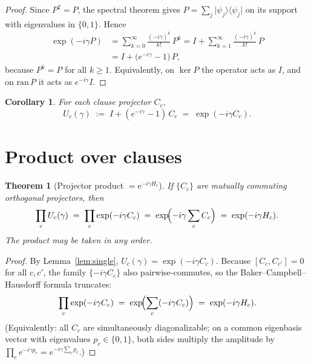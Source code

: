 \documentclass[11pt]{article}
\newtheorem{theorem}{Theorem}
\newtheorem{corollary}{Corollary}
\theoremstyle{definition}
\begin{document}
\begin{proof}
Since $P^2=P$, the spectral theorem gives $P = \sum_j \lvert\psi_j\rangle\langle\psi_j\rvert$
on its support with eigenvalues in $\{0,1\}$.  Hence
\begin{align}
  \exp(-i\gamma P)
  &= \sum_{k=0}^\infty \frac{(-i\gamma)^k}{k!}\,P^k
   = I + \sum_{k=1}^\infty \frac{(-i\gamma)^k}{k!}\,P
   \nonumber\\
  &= I + \bigl(e^{-i\gamma}-1\bigr)\,P,
\end{align}
because $P^k=P$ for all $k\ge 1$.  Equivalently, on $\ker P$ the
operator acts as $I$, and on $\mathrm{ran}\,P$ it acts as
$e^{-i\gamma}I$.
\end{proof}

\begin{corollary}
For each clause projector $C_c$,
\begin{equation}
  U_c(\gamma) \;:=\; I + (e^{-i\gamma}-1)\,C_c
  \;=\;
  \exp(-i\gamma C_c).
\end{equation}
\end{corollary}

\section{Product over clauses}

\begin{theorem}[Projector product $= \mathrm{e}^{-i\gamma H_c}$]
\label{thm:main}
If $\{C_c\}$ are mutually commuting orthogonal projectors, then
\begin{equation}
  \prod_{c} U_c(\gamma)
  \;=\;
  \prod_{c} \exp(-i\gamma C_c)
  \;=\;
  \exp\!\Bigl(-i\gamma \sum_{c} C_c\Bigr)
  \;=\;
  \exp(-i\gamma H_c).
\end{equation}
The product may be taken in any order.
\end{theorem}

\begin{proof}
By Lemma~\ref{lem:single}, $U_c(\gamma)=\exp(-i\gamma C_c)$.
Because $[C_c,C_{c'}]=0$ for all $c,c'$, the family
$\{-i\gamma C_c\}$ also pairwise-commutes, so the Baker--Campbell--Hausdorff
formula truncates:
\begin{equation}
  \prod_{c}\exp(-i\gamma C_c)
  \;=\;
  \exp\!\Bigl(\sum_{c}(-i\gamma C_c)\Bigr)
  \;=\;
  \exp(-i\gamma H_c).
\end{equation}
(Equivalently: all $C_c$ are simultaneously diagonalizable; on a common
eigenbasis vector with eigenvalues $p_c\in\{0,1\}$, both sides multiply
the amplitude by $\prod_c e^{-i\gamma p_c}=e^{-i\gamma\sum_c p_c}$.)
\end{proof}
\end{document}
